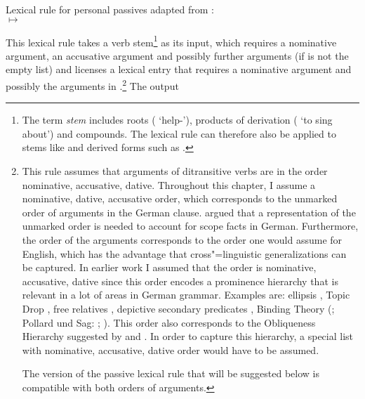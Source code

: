 \ea
\label{pass-lr-mlr}
Lexical rule for personal passives adapted from \citet{Kiss92}:\\
 $\mapsto$ \\
\flushright{}
\z

\addlines
\noindent
This lexical rule takes a verb stem\footnote{
	The term \emph{stem} includes roots ( `help-'), products of derivation
        ( `to sing about') and compounds. The lexical rule can therefore also be applied to
        stems like  and derived forms such as .%
} as its input, which requires a nominative argument, an accusative argument and possibly further arguments (if  is not the empty
list) and licenses a lexical entry that requires a nominative argument and possibly the arguments in
.\footnote{
  This rule assumes that arguments of ditransitive verbs are in the order nominative, accusative,
  dative. Throughout this chapter, I assume a nominative, dative, accusative order, which
  corresponds to the unmarked order of arguments in the German clause. \citet{Kiss2001a} argued that
  a representation of the unmarked order is needed to account for scope facts in
  German. Furthermore, the order of the arguments corresponds to the order one would assume for
  English, which has the advantage that cross"=linguistic generalizations can be captured. In
  earlier work I assumed that the order is nominative, accusative, dative since this order encodes a
  prominence hierarchy that is relevant in a lot of areas in German grammar. Examples are: ellipsis \citep{Klein85},
  Topic Drop \citep{Fries88b}, free relatives
  \citep{Bausewein90,Pittner95b,Mueller99b},
  depictive secondary predicates \citep{Mueller2001c,Mueller2002b,Mueller2008a},
  Binding Theory (\citealp{Grewendorf85a}; Pollard und Sag: \citeyear{PS92};
  \citeyear[Chapter~6]{ps2}). This order also corresponds to the Obliqueness
  Hierarchy suggested by \citet{KC77a} and \citet{Pullum77a}. In order to capture
  this hierarchy, a special list with nominative, accusative, dative order would have to be assumed.

  The version of the passive lexical rule that will be suggested below is compatible with both orders of arguments.
} The output
